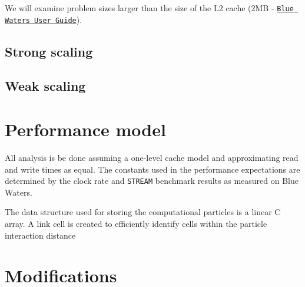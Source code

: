 \documentclass[12pt]{article}
\begin{document}
We will examine problem sizes larger than the size of the L2 cache (2MB - 
\href{https://bluewaters.ncsa.illinois.edu/user-guide}{\texttt{Blue Waters User Guide}}).

\subsection{Strong scaling}

\subsection{Weak scaling}



\section{Performance model}
All analysis is be done assuming a one-level cache model and approximating read and write times as equal. 
The constants used in the performance expectations are determined by the clock rate and \texttt{STREAM}
benchmark results as measured on Blue Waters. 

The data structure used for storing the computational particles is a linear C array.
A link cell is created to efficiently identify cells within the particle interaction distance 




\section{Modifications}
\end{document}
